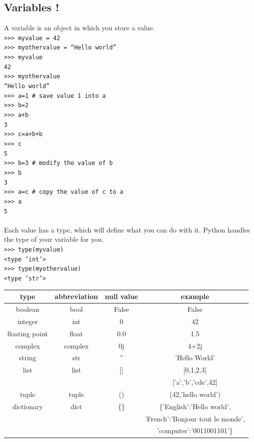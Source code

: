\documentclass[article,10pt]{scrartcl}
\begin{document}
\subsection*{Variables !}
A variable is an object in which you store a value.\\
\texttt{>>> myvalue = 42}\\
\texttt{>>> myothervalue = ``Hello world''}\\
\texttt{>>> myvalue}\\
\texttt{42}\\
\texttt{>>> myothervalue}\\
\texttt{``Hello world''}\\
\texttt{>>> a=1 \# save value 1 into a}\\
\texttt{>>> b=2}\\
\texttt{>>> a+b}\\
\texttt{3}\\
\texttt{>>> c=a+b+b}\\
\texttt{>>> c}\\
\texttt{5}\\
\texttt{>>> b=3 \# modify the value of b}\\
\texttt{>>> b}\\
\texttt{3}\\
\texttt{>>> a=c \# copy the value of c to a}\\
\texttt{>>> a}\\
\texttt{5}\\
\\
Each value has a type, which will define what you can do with it. Python handles the type of your variable for you.\\
\texttt{>>> type(myvalue)}\\
\texttt{<type 'int'>}\\
\texttt{>>> type(myothervalue)}\\
\texttt{<type 'str'>}


\begin{tabular}{|c|c|c|c|}
\hline
type & abbreviation &  null value & example \\
\hline
boolean & bool &  False & False\\ 
\hline
integer & int &  0 & 42 \\
\hline
floating point & float & 0.0 & 1.5 \\
\hline
complex & complex &  0j & 4+2j\\
\hline
string & str &  '' & 'Hello World'\\
\hline
list & list &  [] & [0,1,2,3] \\
& & & ['a','b','cde',42]\\
\hline
tuple & tuple &  () & (42,'hello world')\\
\hline
dictionary & dict &  \{\} & \{'English':'Hello world',\\
&&&'French':'Bonjour tout le monde',\\
&&&'computer':'0011001101'\}\\
\hline
\end{tabular}\\
\end{document}
